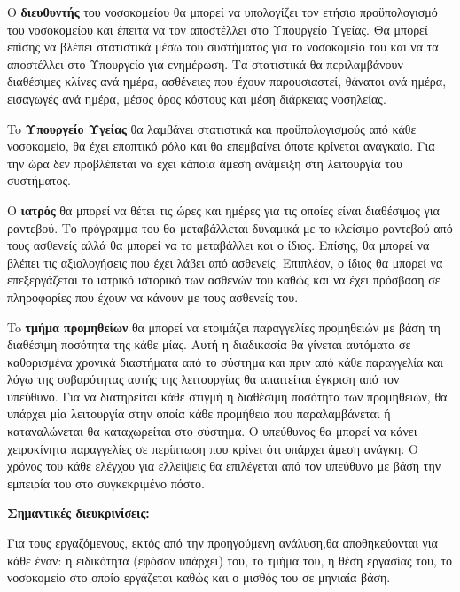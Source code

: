 \documentclass[12pt,a4paper,oneside]{article}
\begin{document}
\hspace{1cm}O \textbf{διευθυντής} του νοσοκομείου θα μπορεί να υπολογίζει τον ετήσιο προϋπολογισμό του νοσοκομείου και έπειτα να τον αποστέλλει στο Υπουργείο Υγείας. Θα μπορεί επίσης να βλέπει στατιστικά μέσω του συστήματος για το νοσοκομείο του και να τα αποστέλλει στο Υπουργείο για ενημέρωση. Τα στατιστικά θα περιλαμβάνουν διαθέσιμες κλίνες ανά ημέρα, ασθένειες που έχουν παρουσιαστεί, θάνατοι ανά ημέρα, εισαγωγές ανά ημέρα, μέσος όρος κόστους και μέση διάρκειας νοσηλείας. \par
\hspace{1cm}To \textbf{Υπουργείο Υγείας} θα λαμβάνει στατιστικά και προϋπολογισμούς από κάθε νοσοκομείο, θα έχει εποπτικό ρόλο και θα επεμβαίνει όποτε κρίνεται αναγκαίο. Για την ώρα δεν προβλέπεται να έχει κάποια άμεση ανάμειξη στη λειτουργία του συστήματος. \par
\newpage
\hspace{1cm}Ο \textbf{ιατρός} θα μπορεί να θέτει τις ώρες και ημέρες για τις οποίες είναι διαθέσιμος για ραντεβού. Το πρόγραμμα του θα μεταβάλλεται δυναμικά με το κλείσιμο ραντεβού από τους ασθενείς αλλά θα μπορεί να το μεταβάλλει και ο ίδιος. Επίσης, θα μπορεί να βλέπει τις αξιολογήσεις που έχει λάβει από ασθενείς. Επιπλέον,  ο ίδιος θα μπορεί να επεξεργάζεται το ιατρικό ιστορικό των ασθενών του καθώς και να έχει πρόσβαση σε πληροφορίες που έχουν να κάνουν με τους ασθενείς του. \par
\hspace{1cm}To \textbf{τμήμα προμηθείων} θα μπορεί να ετοιμάζει παραγγελίες προμηθειών με βάση τη διαθέσιμη ποσότητα της κάθε μίας. Αυτή η διαδικασία θα γίνεται αυτόματα σε καθορισμένα χρονικά διαστήματα από το σύστημα και πριν από κάθε παραγγελία και λόγω της σοβαρότητας αυτής της λειτουργίας θα απαιτείται έγκριση από τον υπεύθυνο. Για να διατηρείται κάθε στιγμή η διαθέσιμη ποσότητα των προμηθειών, θα υπάρχει μία λειτουργία στην οποία κάθε προμήθεια που παραλαμβάνεται ή καταναλώνεται θα καταχωρείται στο σύστημα. Ο υπεύθυνος θα μπορεί να κάνει χειροκίνητα παραγγελίες σε περίπτωση που κρίνει ότι υπάρχει άμεση ανάγκη. Ο χρόνος του κάθε ελέγχου για ελλείψεις θα επιλέγεται από τον υπεύθυνο με βάση την εμπειρία του στο συγκεκριμένο πόστο. \par
\hspace{1cm} \textbf{Σημαντικές διευκρινίσεις:}\par

\hspace{1cm} Για τους εργαζόμενους, εκτός από την προηγούμενη ανάλυση,θα  αποθηκεύονται για κάθε έναν: η ειδικότητα (εφόσον υπάρχει) του, το τμήμα του, η θέση εργασίας του, το νοσοκομείο στο οποίο εργάζεται καθώς και ο μισθός του σε μηνιαία βάση. 
\end{document}
